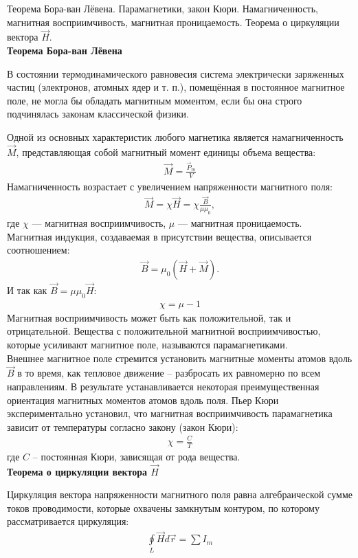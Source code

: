 \documentclass[__main__.tex]{subfiles}
\begin{document}
Теорема Бора-ван Лёвена. Парамагнетики, закон Кюри. Намагниченность, магнитная восприимчивость, магнитная проницаемость. Теорема о циркуляции вектора $\vec{H}$.\\ 

\textbf{Теорема Бора-ван Лёвена}\\
\begin{theorem}
В состоянии термодинамического равновесия система электрически заряженных частиц (электронов, атомных ядер и т. п.), помещённая в постоянное магнитное поле, не могла бы обладать магнитным моментом, если бы она строго подчинялась законам классической физики.
\end{theorem}

Одной из основных характеристик любого магнетика является намагниченность $\vec{M}$, представляющая собой магнитный момент единицы объема вещества:
\begin{gather*}
\vec{M}=\frac{\vec{P}_m}{V}
\end{gather*}
Намагниченность возрастает с увеличением напряженности магнитного поля:
\begin{gather*}
\vec{M}=\chi\vec{H}=\chi\frac{\vec{B}}{\mu\mu_0},
\end{gather*}
где $\chi$ --- магнитная восприимчивость, $\mu$ --- магнитная проницаемость.\\
Магнитная индукция, создаваемая в присутствии вещества, описывается соотношением:
\begin{gather*}
\vec{B}=\mu_0(\vec{H}+\vec{M}).
\end{gather*} 
И так как $\vec{B}=\mu\mu_0 \vec{H}$:
\begin{gather*}
\chi=\mu-1
\end{gather*}
Магнитная восприимчивость может быть как положительной, так и отрицательной. Вещества с положительной магнитной восприимчивостью, которые усиливают магнитное поле, называются парамагнетиками.\\

Внешнее магнитное поле стремится установить магнитные моменты атомов вдоль $\vec{B}$ в то время, как тепловое движение – разбросать их равномерно по всем направлениям. В результате устанавливается некоторая преимущественная ориентация магнитных моментов атомов вдоль поля. Пьер Кюри экспериментально установил, что магнитная восприимчивость парамагнетика зависит от температуры согласно закону (закон Кюри):
\begin{gather*}
\chi=\frac{C}{T}
\end{gather*}
где $C$ – постоянная Кюри, зависящая от рода вещества.\\

\textbf{Теорема о циркуляции вектора $\vec{H}$}\\
\begin{theorem}
Циркуляция вектора напряженности магнитного поля равна алгебраической сумме токов проводимости, которые охвачены замкнутым контуром, по которому рассматривается циркуляция:
\begin{gather*}
\oint\limits_L \vec{H}d\vec{r}=\sum I_m
\end{gather*}
\end{theorem}
\end{document}
